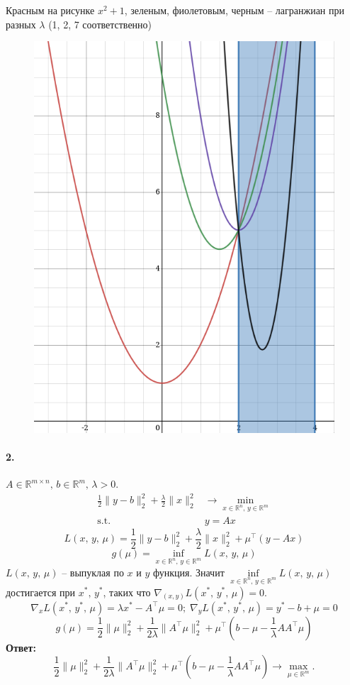 \documentclass{article}
\newcommand*{\R}{\mathbb{R}}
\newcommand*{\st}{\text{s.t. }}
\newcommand*{\1}{\mathbf{1}}
\begin{document}
\noindent
Красным на рисунке $x^2 + 1$, зеленым, фиолетовым, черным -- лагранжиан при разных $\lambda$ (1, 2, 7 соответственно)
\begin{figure}[H]
    \centering 
    \includegraphics[scale=0.4]{graph.png}
\end{figure}


\paragraph{2.} $ A \in \R^{m \times n},\, b \in \R^m,\, \lambda > 0. $ 
\[ \begin{split} 
    \frac{1}{2} \| y - b \|_2^2 + \frac{\lambda}{2} \|x\|_2^2 &\to \min\limits_{x \in \R^n,\, y \in \R^m} \\ 
    \st & y = Ax \end{split} \]
\[ L(x,\, y,\, \mu) = \frac{1}{2}\|y - b\|_2^2 + \frac{\lambda}{2}\|x\|_2^2 + \mu^{\top} (y - Ax) \]
\[ g(\mu) = \inf\limits_{x \in \R^n,\, y \in \R^m} L(x,\, y,\, \mu) \]
$L(x,\, y,\, \mu)$ -- выпуклая по $x$ и $y$ функция. Значит $\inf\limits_{x \in \R^n,\, y \in \R^m} L(x,\, y,\, \mu)$ достигается при $x^\ast,\, y^\ast$, таких что $\nabla_{(x, y)} L(x^\ast,\, y^\ast,\, \mu) = 0$.
\[ \nabla_x L(x^\ast,\, y^\ast,\, \mu) = \lambda x^\ast - A^\top \mu = 0;\; \nabla_y L(x^\ast,\, y^\ast,\, \mu) = y^\ast - b + \mu = 0 \]
\[ g(\mu) = \frac12 \|\mu\|_2^2 + \frac{1}{2\lambda} \|A^\top \mu\|_2^2 + \mu^\top \left(b - \mu - \frac{1}{\lambda} AA^\top \mu\right) \]
\textbf{Ответ: }
\[ \frac12 \|\mu\|_2^2 + \frac{1}{2\lambda} \|A^\top \mu\|_2^2 + \mu^\top \left(b - \mu - \frac{1}{\lambda} AA^\top \mu\right) \to \max\limits_{\mu \in \R^m}. \]
\end{document}
